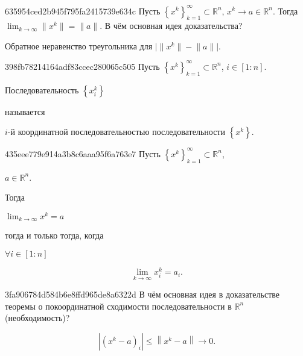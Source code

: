 \begin{note}{635954ced2b945f795fa2415739e634c}
    Пусть \({ \left\{ x^{k} \right\}_{k = 1}^{\infty} \subset \mathbb R^{n} }\),\: \({ x^{k} \to a \in \mathbb R^{n} }\).
    Тогда \({ \displaystyle \lim_{k \to \infty} \lVert x^{k} \rVert = \lVert a \rVert }\).
    В чём основная идея доказательства?

    \begin{cloze}{1}
        Обратное неравенство треугольника для \({ \big\lvert \lVert x^{k} \rVert - \lVert a \rVert \big\rvert }\).
    \end{cloze}
\end{note}

\begin{note}{398fb78214164adf83ccec280065c505}
    Пусть \({ \left\{ x^{k} \right\}_{k = 1}^{\infty} \subset \mathbb R^{n} }\),\: \({ i \in [1 : n] }\).
    \begin{icloze}{1}Последовательность \({ \left\{ x_i^{k} \right\} }\)\end{icloze} называется \begin{icloze}{2}\({ i }\)-й координатной последовательностью последовательности \({ \left\{ x^{k} \right\} }\).\end{icloze}
\end{note}

\begin{note}{435eee779e914a3b8c6aaa95f6a763e7}
    Пусть \({ \left\{ x^{k} \right\}_{k = 1}^{\infty} \subset \mathbb R^{n} }\),\: \begin{icloze}{4}\({ a \in \mathbb R^{n} }\).\end{icloze}
    Тогда \begin{icloze}{2}\({ \displaystyle \lim_{k \to \infty} x^{k} = a }\)\end{icloze} \begin{icloze}{3}тогда и только тогда, когда\end{icloze} \({ \forall i \in [1 : n] }\)
    \begin{icloze}{1}
        \[
            \displaystyle \lim_{k \to \infty} x_i^{k} = a_i.
        \]
    \end{icloze}
\end{note}

\begin{note}{3fa906784d584b6e8ffd965de8a6322d}
    В чём основная идея в доказательстве теоремы о покоординатной сходимости последовательности в \({ \mathbb R^{n} }\) (необходимость)?

    \begin{cloze}{1}
        \[
            \left\lvert (x^{k} -  a)_i \right\rvert \leqslant \left\lVert x^{k} - a \right\rVert \to 0.
        \]
    \end{cloze}
\end{note}

